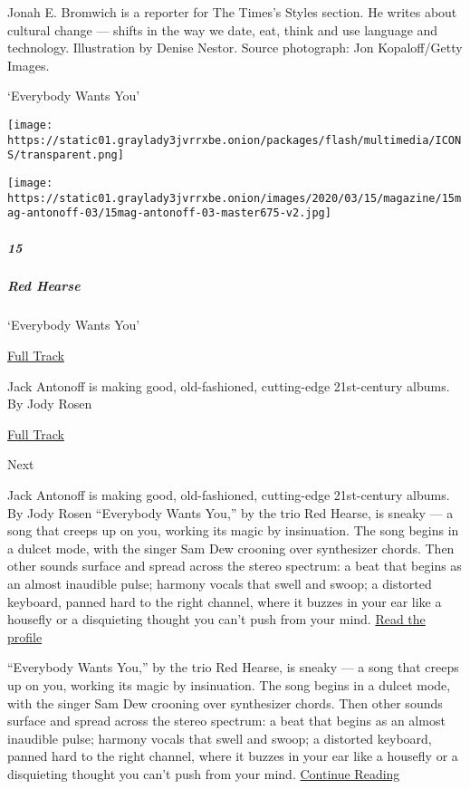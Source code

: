 Jonah E. Bromwich is a reporter for The Times's Styles section. He
writes about cultural change --- shifts in the way we date, eat, think
and use language and technology. Illustration by Denise Nestor. Source
photograph: Jon Kopaloff/Getty Images.

`Everybody Wants You'

\texttt{[image: https://static01.graylady3jvrrxbe.onion/packages/flash/multimedia/ICONS/transparent.png]}

\texttt{[image: https://static01.graylady3jvrrxbe.onion/images/2020/03/15/magazine/15mag-antonoff-03/15mag-antonoff-03-master675-v2.jpg]}

\hypertarget{15}{%
\subparagraph{15}\label{15}}

\hypertarget{red-hearse}{%
\subparagraph{Red Hearse}\label{red-hearse}}

`Everybody Wants You'

\href{https://open.spotify.com/track/4ab0gHfPvYGeF8qNycLNkE}{ Full
Track}

Jack Antonoff is making good, old-fashioned, cutting-edge 21st-century
albums. By Jody Rosen

\href{https://open.spotify.com/track/4ab0gHfPvYGeF8qNycLNkE}{Full Track
}

Next

Jack Antonoff is making good, old-fashioned, cutting-edge 21st-century
albums. By Jody Rosen ``Everybody Wants You,'' by the trio Red Hearse,
is sneaky --- a song that creeps up on you, working its magic by
insinuation. The song begins in a dulcet mode, with the singer Sam Dew
crooning over synthesizer chords. Then other sounds surface and spread
across the stereo spectrum: a beat that begins as an almost inaudible
pulse; harmony vocals that swell and swoop; a distorted keyboard, panned
hard to the right channel, where it buzzes in your ear like a housefly
or a disquieting thought you can't push from your mind.
\href{https://www.nytimes3xbfgragh.onion/interactive/2020/03/11/magazine/jack-antonoff-profile.html}{Read
the profile}

``Everybody Wants You,'' by the trio Red Hearse, is sneaky --- a song
that creeps up on you, working its magic by insinuation. The song begins
in a dulcet mode, with the singer Sam Dew crooning over synthesizer
chords. Then other sounds surface and spread across the stereo spectrum:
a beat that begins as an almost inaudible pulse; harmony vocals that
swell and swoop; a distorted keyboard, panned hard to the right channel,
where it buzzes in your ear like a housefly or a disquieting thought you
can't push from your mind.
\href{https://www.nytimes3xbfgragh.onion/interactive/2020/03/11/magazine/jack-antonoff-profile.html}{Continue
Reading}

